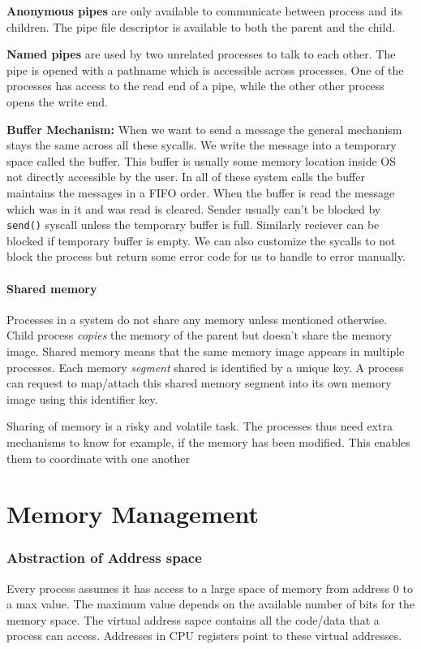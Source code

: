 \documentclass[12pt]{article}
\newcommand{\tbox}[1]{\noindent\fbox{\parbox{\textwidth}{#1}}}
\begin{document}
\textbf{Anonymous pipes} are only available to communicate between process and its children. The pipe file descriptor is available to both the parent and the child.

\textbf{Named pipes} are used by two unrelated processes to talk to each other. The pipe is opened with a pathname which is accessible across processes. One of the processes
has access to the read end of a pipe, while the other other process opens the write end. 


\textbf{Buffer Mechanism:}  
When we want to send a message the general mechanism stays the same across all these sycalls. We write the message into a temporary space called the buffer. This buffer is usually some memory location
inside OS not directly accessible by the user.
In all of these system calls the buffer maintains the messages in a FIFO order. When the buffer is read the message which was in it and was read is cleared. Sender 
usually can't be blocked by \texttt{send()} syscall unless the temporary buffer is full. Similarly reciever can be blocked if temporary buffer is empty. We can also customize the sycalls to not block the process
but return some error code for us to handle to error manually.

\subsection{Shared memory}
Processes in a system do not share any memory unless mentioned otherwise. Child process \textit{copies} the memory of the parent but doesn't share the memory image.
Shared memory means that the same memory image appears in multiple processes. Each memory \textit{segment} shared is identified by a unique key. A process can request to map/attach this shared 
memory segment into its own memory image using this identifier key. 

Sharing of memory is a risky and volatile task. The processes thus need extra mechanisms to know for example, if the memory has been modified. This enables them to coordinate with one another

\newpage
\noindent\tbox{
    \begin{center}
    \textbf{\Huge Lecture 12}
    \end{center}
}
\part{Memory Management}
\section*{Abstraction of Address space}
Every process assumes it has access to a large space of memory from address 0 to a max value. The maximum value depends on the available number of bits for the memory space.
The virtual address sapce contains all the code/data that a process can access. Addresses in CPU registers point to these virtual addresses.
\end{document}
